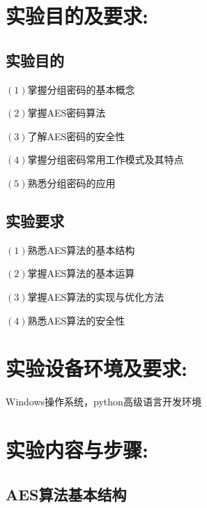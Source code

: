 \documentclass[a4paper,11pt,UTF8]{ctexart}
\begin{document}
\section{实验目的及要求:}
    \subsection{实验目的}
        $(1)$掌握分组密码的基本概念\par
        $(2)$掌握AES密码算法\par
        $(3)$了解AES密码的安全性\par
        $(4)$掌握分组密码常用工作模式及其特点\par
        $(5)$熟悉分组密码的应用\par
    \subsection{实验要求}
        $(1)$熟悉AES算法的基本结构\par
        $(2)$掌握AES算法的基本运算\par
        $(3)$掌握AES算法的实现与优化方法\par
        $(4)$熟悉AES算法的安全性\par


\section{实验设备环境及要求:}
    Windows操作系统，python高级语言开发环境

\section{实验内容与步骤:}
    \subsection{AES算法基本结构}
\newpage
\end{document}
